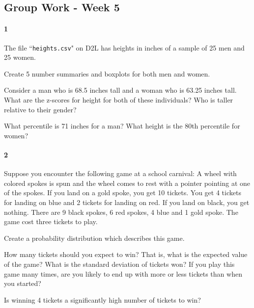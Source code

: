 \documentclass{article}
\begin{document}
\begin{flushleft}
\section*{Group Work - Week 5}

\paragraph{1} The file ``\verb+heights.csv+" on D2L has heights in inches of a sample of 25 men and 25 women.\\ \medskip


\begin{enumalpha}
\item Create 5 number summaries and boxplots for both men and women.
\vspace{1.75in}

\item Consider a man who is 68.5 inches tall and a woman who is 63.25 inches tall. What are the z-scores for height for both of these individuals? Who is taller relative to their gender?
\vspace{1.75in}

\item What percentile is 71 inches for a man? What height is the 80th percentile for women?

\end{enumalpha}

\newpage
\paragraph{2} Suppose you encounter the following game at a school carnival: A wheel with colored spokes is spun and the wheel comes to rest with a pointer pointing at one of the spokes. If you land on a gold spoke, you get 10 tickets. You get 4 tickets for landing on blue and 2 tickets for landing on red. If you land on black, you get nothing. There are 9 black spokes, 6 red spokes, 4 blue and 1 gold spoke. The game cost three tickets to play.

\begin{enumalpha}
\item Create a probability distribution which describes this game.
\vspace{1.75in}

\item How many tickets should you expect to win? That is, what is the expected value of the game? What is the standard deviation of tickets won? If you play this game many times, are you likely to end up with more or less tickets than when you started?
\vspace{1.75in}

\item Is winning 4 tickets a significantly high number of tickets to win?
\end{enumalpha} 
\end{flushleft}
\end{document}
